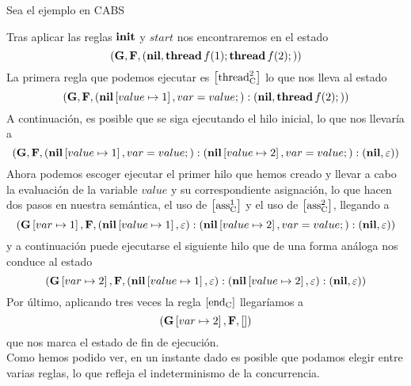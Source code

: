 Sea el ejemplo en CABS

Tras aplicar las reglas $\textbf{init}$ y $start$ nos encontraremos en el estado
$$
(\mathbf{G}, \mathbf{F}, (\textbf{nil}, \textbf{thread} \,f(1)\mbox{;\,}\textbf{thread} \,f(2)\mbox{;\,}))
$$
La primera regla que podemos ejecutar es $\left[ \text{thread}_{\text{C}}^2 \right]$ lo que nos lleva al estado
$$
(\mathbf{G}, \mathbf{F}, (\textbf{nil}\left[ value\mapsto1 \right], var = value\mbox{;\,}):(\textbf{nil}, \textbf{thread} \,f(2)\mbox{;\,}))
$$
A continuación, es posible que se siga ejecutando el hilo inicial, lo que nos llevaría a
$$
(\mathbf{G}, \mathbf{F}, (\textbf{nil}\left[ value\mapsto1 \right], var = value\mbox{;\,}):(\textbf{nil}\left[ value\mapsto2 \right], var = value\mbox{;\,}):(\textbf{nil}, \varepsilon))
$$
Ahora podemos escoger ejecutar el primer hilo que hemos creado y llevar a cabo la evaluación de la variable $value$ y su correspondiente asignación, lo que hacen dos pasos en nuestra semántica, el uso de $\left[ \text{ass}_{\text{C}}^{1} \right]$ y el uso de $\left[ \text{ass}_{\text{C}}^{2} \right]$, llegando a
$$
(\mathbf{G}\left[ var\mapsto1 \right], \mathbf{F}, (\textbf{nil}\left[ value\mapsto1 \right], \varepsilon):(\textbf{nil}\left[ value\mapsto2 \right], var = value\mbox{;\,}):(\textbf{nil}, \varepsilon))
$$
y a continuación puede ejecutarse el siguiente hilo que de una forma análoga nos conduce al estado
$$
(\mathbf{G}\left[ var\mapsto2 \right], \mathbf{F}, (\textbf{nil}\left[ value\mapsto1 \right], \varepsilon):(\textbf{nil}\left[ value\mapsto2 \right], \varepsilon):(\textbf{nil}, \varepsilon))
$$
Por último, aplicando tres veces la regla $\left[ \text{end}_{\text{C}} \right]$ llegaríamos a
$$
(\mathbf{G}\left[ var\mapsto2 \right], \mathbf{F}, [])
$$
que nos marca el estado de fin de ejecución.\\

Como hemos podido ver, en un instante dado es posible que podamos elegir entre varias reglas, lo que refleja el indeterminismo de la concurrencia.
